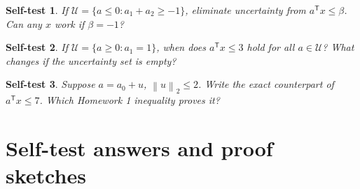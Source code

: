 \documentclass[11pt]{article}
\newcommand{\T}{^{\mathsf T}}
\newcommand{\norm}[1]{\left\lVert#1\right\rVert}
\newtheorem{exercise}{Self-test}
\begin{document}
\begin{exercise}
If $\mathcal U=\{a\le0:a_1+a_2\ge-1\}$, eliminate uncertainty from
$a\T x\le\beta$. Can any $x$ work if $\beta=-1$?
\end{exercise}
\begin{exercise}
If $\mathcal U=\{a\ge0:a_1=1\}$, when does $a\T x\le3$ hold for all
$a\in\mathcal U$? What changes if the uncertainty set is empty?
\end{exercise}
\begin{exercise}
Suppose $a=a_0+u$, $\norm{u}_2\le2$. Write the exact counterpart of
$a\T x\le7$. Which Homework 1 inequality proves it?
\end{exercise}

\newpage
\section{Self-test answers and proof sketches}
\end{document}
